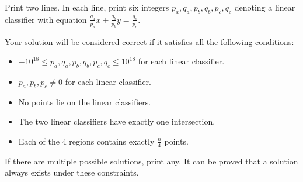 Print two lines.
In each line, print six integers $p_a,q_a,p_b,q_b,p_c,q_c$ denoting a linear classifier with equation $\frac{q_a}{p_a} x + \frac{q_b}{p_b} y = \frac{q_c}{p_c}$. 

Your solution will be considered correct if it satisfies all the following conditions:
\begin{itemize}
\item $-10^{18} \leq p_a,q_a,p_b,q_b,p_c,q_c \leq 10^{18}$ for each linear classifier.
\item $p_a,p_b,p_c \neq 0$ for each linear classifier.
\item No points lie on the linear classifiers.
\item The two linear classifiers have exactly one intersection.
\item Each of the $4$ regions contains exactly $\frac{n}{4}$ points.
\end{itemize}
If there are multiple possible solutions, print any. It can be proved that a solution always exists under these constraints.